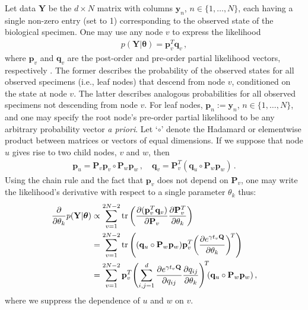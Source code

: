\documentclass[9pt,twocolumn,twoside]{pnas-new}
\newcommand{\?}{\textbf{?}}
\newcommand{\Y}{\textbf{Y}}
\newcommand{\y}{\mathbf{y}}
\newcommand{\QQ}{\mathbf{Q}}
\newcommand{\ttheta}{\boldsymbol{\theta}}
\renewcommand{\P}{\mathbf{P}}
\newcommand{\p}{\mathbf{p}}
\newcommand{\q}{\mathbf{q}}
\begin{document}
Let data $\Y$ be the $d\times N$ matrix with columns $\y_n$, $n \in \{1,\dots,N\}$, each
having a single non-zero entry (set to 1) corresponding to the
observed state of the biological specimen.  One may use
any node $v$ to express the likelihood
 \begin{align}
p(\Y|\ttheta) = \p_v^T \q_v \, ,
 \end{align}
 where $\p_v$ and $\q_v$ are the post-order and pre-order partial
 likelihood vectors, respectively \cite{ji2020gradients}.  The former describes the
 probability of the observed states for all observed specimens (i.e.,
 leaf nodes) that descend from node $v$, conditioned on the state at
 node $v$. The latter describes analogous probabilities for all
 observed specimens not descending from node $v$. For leaf nodes,
 $\p_n:=\y_n$, $n \in \{1,\dots,N\}$, and one may specify the root node's pre-order partial likelihood to be any arbitrary probability vector \emph{a priori}. Let `$\circ$' denote the Hadamard or elementwise product between matrices or vectors of equal dimensions.  If we suppose that node $u$ gives rise to two child
 nodes, $v$ and $w$, then
\begin{align}\label{eq:recursions}
  \p_u = \P_v \p_v \circ \P_w \p_w\, ,
  \quad \q_v= \P_v^T \left( \q_u \circ  \P_w \p_w\right) \, .
\end{align}
Using the chain rule and the fact that $\p_v$ does not depend on
$\P_v$, one may write the likelihood's derivative with respect to a
single parameter $\theta_k$ thus:
\begin{align}\label{eq:phyloGrad}
	\frac{\partial}{\partial \theta_k}  p(\Y|\ttheta) 
  &\propto   \sum_{v=1}^{2N-2}
    \mbox{tr} \left( \frac{\partial (\p_v^T\q_v)}{\partial \P_v}
    \frac{\partial \P^T_v}{\partial \theta_k} \right) \\ \notag
  &= \sum_{v=1}^{2N-2} \mbox{tr} \left(  (\q_u\circ \P_w\p_w)
    \p_v^T\bigg( \frac{\partial e^{\gamma t_v \QQ}}{\partial \theta_k}\bigg)^{\!T}\right)  \\ \nonumber
  &=\sum_{v=1}^{2N-2} \p_v^T
    \Biggl(\sum_{i,j=1}^d  \frac{\partial e^{\gamma t_v \QQ}}{\partial q_{ij}} \frac{\partial q_{ij}}{\partial \theta_k} \Biggr)^{\!T}
    \hspace{-0.3em}(\q_u\circ \P_w\p_w)  \, ,
\end{align}
where we suppress the dependence of $u$ and $w$ on $v$.
\end{document}
